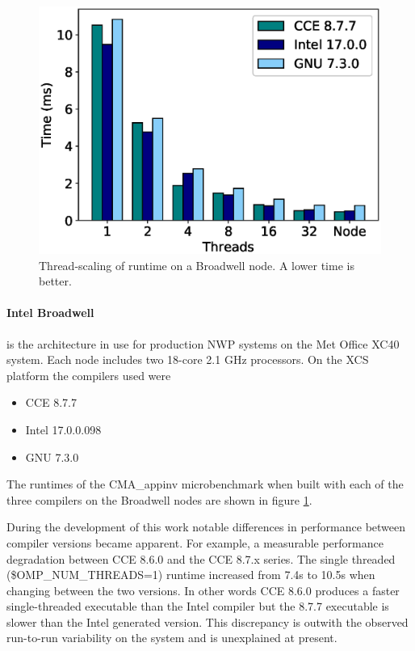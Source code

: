 \begin{figure}
\centering\includegraphics[scale=0.5]{figs/Broadwell_microbenchmark_vanilla.eps}
\caption{Thread-scaling of runtime on a Broadwell node. A lower time is better.}
\label{fig:cma_broadwell}
\end{figure}


\paragraph{Intel Broadwell} is the architecture in use for production NWP systems on the Met Office XC40 system.
Each node includes two 18-core 2.1 GHz processors.
On the XCS platform the compilers used were
\begin{itemize}
\item CCE 8.7.7
\item Intel 17.0.0.098
\item GNU 7.3.0
\end{itemize}

The runtimes of the CMA\_appinv microbenchmark when built with each of the three compilers on the Broadwell nodes are shown in figure \ref{fig:cma_broadwell}.

During the development of this work notable differences in performance between compiler versions became apparent.
For example, a measurable performance degradation between CCE 8.6.0 and the CCE 8.7.x series.
The single threaded (\$OMP\_NUM\_THREADS=1) runtime increased from 7.4s to 10.5s when changing between the two versions.
In other words CCE 8.6.0 produces a faster single-threaded executable than the Intel compiler but the 8.7.7 executable is slower than the Intel generated version.
This discrepancy is outwith the observed run-to-run variability on the system and is unexplained at present.

